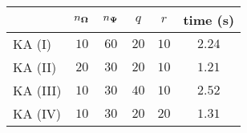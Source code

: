 \centering
\renewcommand{\arraystretch}{1.2}
\begin{tabular}{@{}lccccc@{}}
\toprule
 & $n_{\boldsymbol{\Omega}}$ & $n_{\boldsymbol{\Psi}}$ & $q$ & $r$ & time (s)\\
\midrule
KA (I) & $10$ & $60$ & $20$ & $10$ & $2.24$ \\
KA (II) & $20$ & $30$ & $20$ & $10$ & $1.21$ \\
KA (III) & $10$ & $30$ & $40$ & $10$ & $2.52$ \\
KA (IV) & $10$ & $30$ & $20$ & $20$ & $1.31$ \\
\bottomrule
\end{tabular}

